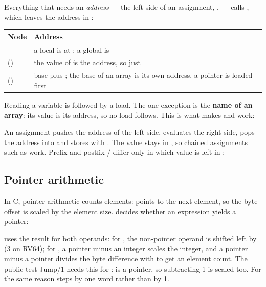\documentclass[12pt]{article}
\begin{document}
Everything that needs an \emph{address} --- the left side of an assignment, \code{&}, \code{++} --- calls
, which leaves the address in :


\begin{center}
\begin{tabularx}{\linewidth}{@{}lL@{}}
\toprule
Node & Address \\
\midrule
{} & a local is at ; a global is  \\
 () & the value of  is the address, so just  \\
 () & base plus ; the base of an array is its own address, a pointer is loaded first \\
\bottomrule
\end{tabularx}
\end{center}

Reading a variable is  followed by a load. The one exception is the \textbf{name of an array}:
its value is its address, so no load follows. This is what makes  and  work:


An assignment pushes the address of the left side, evaluates the right side, pops the address into
 and stores with . The value stays in , so chained assignments such as
 work. Prefix and postfix \code{++}/\code{--} differ only in which value is left in :


\subsection{Pointer arithmetic}
\label{sec:ptr}

In C, pointer arithmetic counts elements:  points to the next element, so the byte offset is
scaled by the element size.  decides whether an expression yields a pointer:


 uses the result for both operands: for \code{+}, the non-pointer operand is shifted left by
 (3 on RV64); for \code{-}, a pointer minus an integer scales the integer, and a pointer minus a
pointer divides the byte difference with  to get an element count. The public test Jump/1 needs
this for :  is a pointer, so subtracting 1 is scaled too. For the same
reason  steps by one word rather than by 1.
\end{document}
